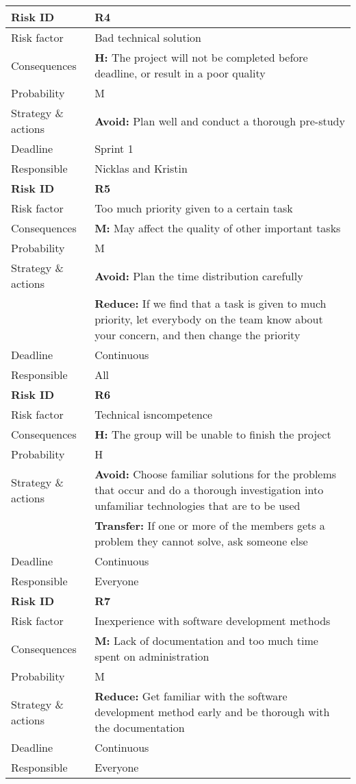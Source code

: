 \begin{longtable}{>{\setlength\hsize{.3\hsize}}X|>{\setlength\hsize{0.7\hsize}}X}
\textbf{Risk ID} & \textbf{R4} \\ \hline \hline
Risk factor & Bad technical solution                                                \\
Consequences & \textbf{H:} The project will not be completed before deadline, or result in a poor quality \\
Probability & M \\
Strategy \& actions & \textbf{Avoid:} Plan well and conduct a thorough pre-study \\
Deadline & Sprint 1 \\
Responsible & Nicklas and Kristin \\ \hline

\textbf{Risk ID} & \textbf{R5} \\ \hline \hline
Risk factor & Too much priority given to a certain task \\
Consequences & \textbf{M:} May affect the quality of other important tasks \\
Probability & M \\
Strategy \& actions & \textbf{Avoid:} Plan the time distribution carefully\\
 & \textbf{Reduce:} If we find that a task is given to much priority, let everybody on the team know about your concern, and then change the priority \\
Deadline & Continuous \\
Responsible & All \\ \hline

\newpage

\hline
\textbf{Risk ID} & \textbf{R6} \\ \hline \hline
Risk factor & Technical isncompetence \\
Consequences & \textbf{H:} The group will be unable to finish the project \\
Probability & H \\
Strategy \& actions & \textbf{Avoid:} Choose familiar solutions for the problems that occur and do a thorough investigation into unfamiliar technologies that are to be used\\
 & \textbf{Transfer:} If one or more of the members gets a problem they cannot solve, ask someone else \\
Deadline & Continuous \\
Responsible & Everyone \\ \hline

\textbf{Risk ID} & \textbf{R7} \\ \hline \hline
Risk factor & Inexperience with software development methods \\
Consequences & \textbf{M:} Lack of documentation and too much time spent on administration \\
Probability & M \\
Strategy \& actions & \textbf{Reduce:} Get familiar with the software development method early and be thorough with the documentation \\
Deadline & Continuous \\
Responsible & Everyone \\ \hline


\end{longtable}
